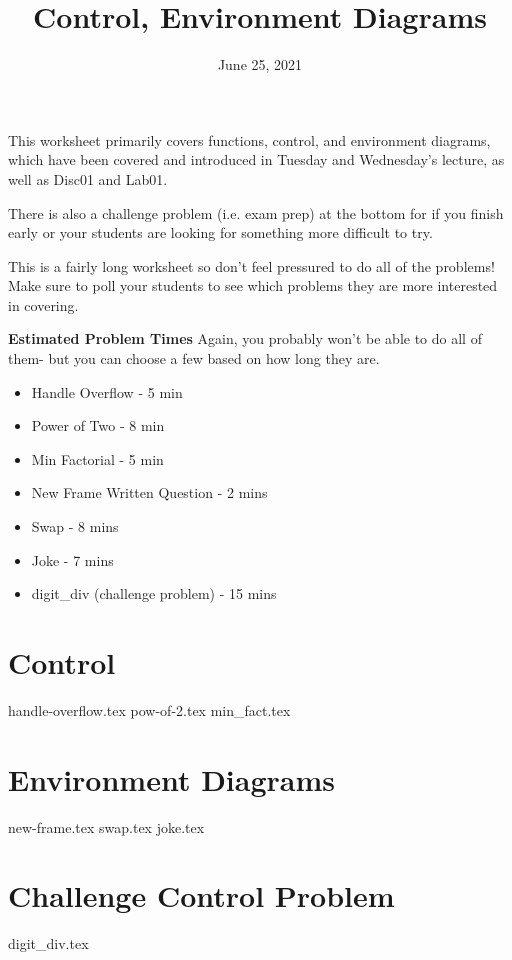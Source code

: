 \documentclass{exam}
\title{Control, Environment Diagrams}
\date{June 25, 2021}
\begin{document}
\maketitle


\begin{blocksection}
\begin{guide}
  This worksheet primarily covers functions, control, and environment diagrams, which have been covered and introduced in Tuesday and Wednesday's lecture, as well as Disc01 and Lab01.
  
  There is also a challenge problem (i.e. exam prep) at the bottom for if you finish early or your students are looking for something more difficult to try.
  
This is a fairly long worksheet so don't feel pressured to do all of the problems! Make sure to poll your students to see which problems they are more interested in covering.

\textbf{Estimated Problem Times}
\newline
Again, you probably won't be able to do all of them- but you can choose a few based on how long they are.
\begin{itemize}
    \item Handle Overflow - 5 min
    \item Power of Two - 8 min
    \item Min Factorial - 5 min
    \item New Frame Written Question - 2 mins
    \item Swap - 8 mins
    \item Joke - 7 mins
    \item digit\_div (challenge problem) - 15 mins
\end{itemize}
\end{guide}
\end{blocksection}

\section{Control}
\begin{questions}
{handle-overflow.tex}
{pow-of-2.tex}
{min_fact.tex}
\end{questions}

\newpage

\section{Environment Diagrams}
\begin{questions}
{new-frame.tex}
{swap.tex}
\newpage
{joke.tex}
\end{questions}

\newpage
\section{Challenge Control Problem}
\begin{questions}
{digit_div.tex}

\clearpage

\end{questions}
\end{document}
